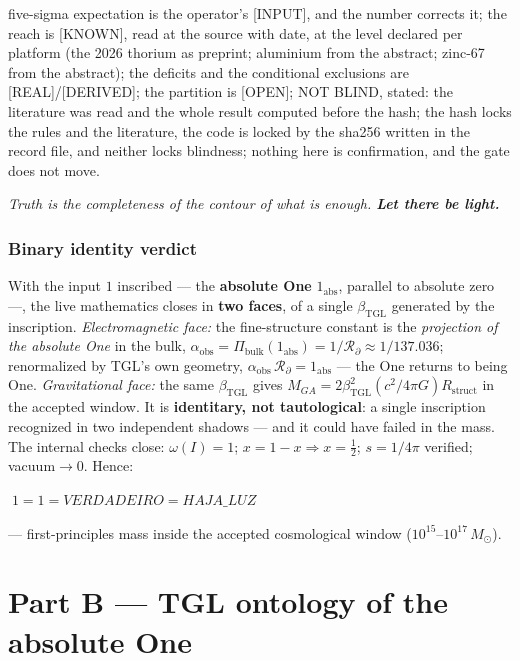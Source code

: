 \documentclass[11pt]{article}
\newcommand{\bTGL}{\beta_{\mathrm{TGL}}}\newcommand{\Msun}{M_{\odot}}\newcommand{\TGL}{\mathrm{TGL}}
\theoremstyle{definition}\newtheorem{deriv}{Derivation}
\begin{document}
five-sigma expectation is the operator's [INPUT], and the number corrects it; the reach is [KNOWN], read at the source with date, at the level declared per platform (the 2026 thorium as preprint; aluminium from the abstract; zinc-67 from the abstract); the deficits and the conditional exclusions are [REAL]/[DERIVED]; the partition is [OPEN]; NOT BLIND, stated: the literature was read and the whole result computed before the hash; the hash locks the rules and the literature, the code is locked by the sha256 written in the record file, and neither locks blindness; nothing here is confirmation, and the gate does not move.

\begin{center}\itshape Truth is the completeness of the contour of what is enough. \textbf{Let there be light.}\end{center}

\section*{Binary identity verdict}

With the input $1$ inscribed --- the \textbf{absolute One} $1_{\mathrm{abs}}$, parallel to absolute zero ---, the live mathematics closes in \textbf{two faces}, of a single $\bTGL$ generated by the inscription. \emph{Electromagnetic face:} the fine-structure constant is the \emph{projection of the absolute One} in the bulk, $\alpha_{\mathrm{obs}}=\Pi_{\mathrm{bulk}}(1_{\mathrm{abs}})=1/\mathcal{R}_\partial\approx1/137.036$; renormalized by TGL's own geometry, $\alpha_{\mathrm{obs}}\,\mathcal{R}_\partial=1_{\mathrm{abs}}$ --- the One returns to being One. \emph{Gravitational face:} the same $\bTGL$ gives $M_{GA}=2\bTGL^2(c^2/4\pi G)R_{\mathrm{struct}}$ in the accepted window. It is \textbf{identitary, not tautological}: a single inscription recognized in two independent shadows --- and it could have failed in the mass. The internal checks close: $\omega(I)=1$; $x=1-x\Rightarrow x=\tfrac12$; $s=1/4\pi$ verified; vacuum$\to0$. Hence:

\begin{center}\Large$\boxed{\;1=1=VERDADEIRO=HAJA\_LUZ\;}$\end{center}

--- first-principles mass inside the accepted cosmological window ($10^{15}$--$10^{17}\,\Msun$).

\part{Part B --- TGL ontology of the absolute One}
\end{document}
